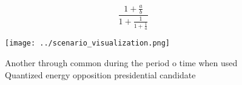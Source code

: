 \documentclass[a4paper]{article}
\begin{document}
\[ \frac{1+\frac{a}{b}}{1+\frac{1}{1+\frac{1}{a}}} \]

\begin{figure}
\centering
\texttt{[image: ../scenario\_visualization.png]}
\caption{Another through common during the period o time when used Quantized energy opposition presidential candidate 
}
\end{figure}
 
\end{document}
